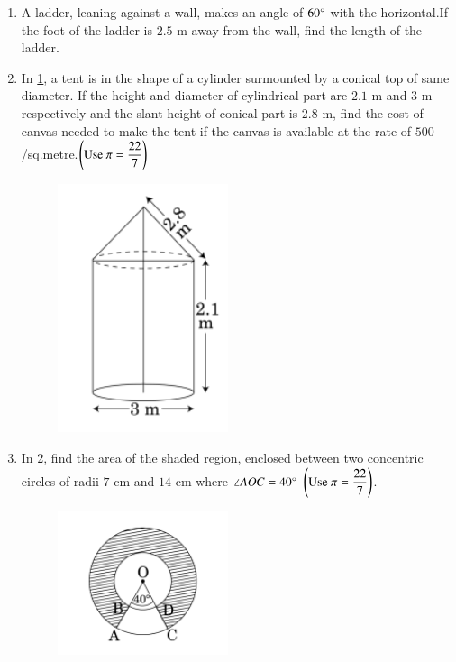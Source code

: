\begin{enumerate}
\item A ladder, leaning against a wall, makes an angle of $60 \degree$ with the horizontal.If the foot of the ladder is $2.5$ m away from the wall, find the length of the ladder.\\
\item  In \ref{figure_7}, a tent is in the shape of a cylinder surmounted by a conical top of same diameter. If the height and diameter of cylindrical part are $2.1$ m and $3$ m respectively and the slant height of conical part is $2.8$ m, find the cost of canvas needed to make the tent if the canvas is available at the rate of \rupee $500$/sq.metre.$\left(\text{Use } \pi = \dfrac{22}{7}\right)$\\
	\begin{figure}[H]
      \centering
      \includegraphics[width=5cm]{figs/2016_10_5.png}
      \caption{}
      \label{figure_7}
\end{figure} 
\item  In \ref{figure_8}, find the area of the shaded region, enclosed between two concentric circles of radii $7$ cm and $14$ cm where $\angle AOC = 40\degree$ $\left(\text{Use }\pi =\dfrac{22}{7}\right)$.
	\begin{figure}[H]
      \centering
      \includegraphics[width=5cm]{figs/2016_10_6.png}
      \caption{}
      \label{figure_8}
\end{figure} 

\end{enumerate}
